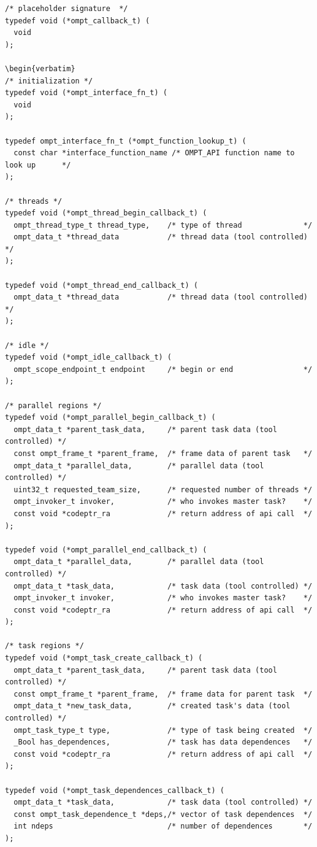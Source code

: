 \documentclass{article}
\begin{document}
\begin{verbatim}
/* placeholder signature  */
typedef void (*ompt_callback_t) (    
  void
);

\begin{verbatim}
/* initialization */
typedef void (*ompt_interface_fn_t) (
  void
);

typedef ompt_interface_fn_t (*ompt_function_lookup_t) (
  const char *interface_function_name /* OMPT_API function name to look up      */
);

/* threads */
typedef void (*ompt_thread_begin_callback_t) (
  ompt_thread_type_t thread_type,    /* type of thread              */
  ompt_data_t *thread_data           /* thread data (tool controlled) */
);

typedef void (*ompt_thread_end_callback_t) (
  ompt_data_t *thread_data           /* thread data (tool controlled) */
);

/* idle */
typedef void (*ompt_idle_callback_t) ( 
  ompt_scope_endpoint_t endpoint     /* begin or end                */
);

/* parallel regions */
typedef void (*ompt_parallel_begin_callback_t) (
  ompt_data_t *parent_task_data,     /* parent task data (tool controlled) */
  const ompt_frame_t *parent_frame,  /* frame data of parent task   */
  ompt_data_t *parallel_data,        /* parallel data (tool controlled) */
  uint32_t requested_team_size,      /* requested number of threads */
  ompt_invoker_t invoker,            /* who invokes master task?    */
  const void *codeptr_ra             /* return address of api call  */ 
);

typedef void (*ompt_parallel_end_callback_t) (
  ompt_data_t *parallel_data,        /* parallel data (tool controlled) */
  ompt_data_t *task_data,            /* task data (tool controlled) */
  ompt_invoker_t invoker,            /* who invokes master task?    */
  const void *codeptr_ra             /* return address of api call  */ 
);

/* task regions */
typedef void (*ompt_task_create_callback_t) ( 
  ompt_data_t *parent_task_data,     /* parent task data (tool controlled) */
  const ompt_frame_t *parent_frame,  /* frame data for parent task  */
  ompt_data_t *new_task_data,        /* created task's data (tool controlled) */
  ompt_task_type_t type,             /* type of task being created  */ 
  _Bool has_dependences,             /* task has data dependences   */
  const void *codeptr_ra             /* return address of api call  */ 
);

typedef void (*ompt_task_dependences_callback_t) (                                   
  ompt_data_t *task_data,            /* task data (tool controlled) */
  const ompt_task_dependence_t *deps,/* vector of task dependences  */
  int ndeps                          /* number of dependences       */
);


\end{verbatim}
\end{document}

